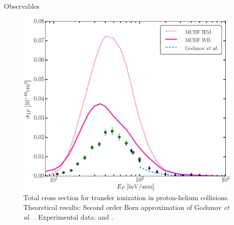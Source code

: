 \documentclass[letterpaper, 12 pt]{report}
\begin{document}
\begin{chapter}{Observables \label{chap:p-he2p-he}}
\begin{figure}[htp]
   \centering
   \includegraphics[width = \linewidth]{./images/phe/phe-IP.eps}
   \caption[Total cross section for transfer ionization in proton-helium collisions.]
           {Total cross section for transfer ionization in proton-helium collisions.
            Theoretical results: Second order Born approximation of Godunov \textit{et al}.\
            \cite{Godunov-06}. Experimental data: {\color{OliveGreen}{$\bullet$}} \cite{SG89} and
            {\color{blue}{$\blacklozenge$}} \cite{SG85}. \label{fig:phe-ip}}
\end{figure}


\end{chapter}
\end{document}
